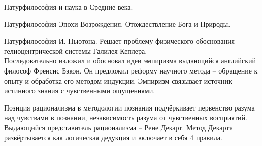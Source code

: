 \documentclass[exam_answers.tex]{subfiles}
\begin{document}
Натурфилософия и наука в Средние века.

Натурфилософия Эпохи Возрождения.
Отождествление Бога и Природы.

Натурфилософия И. Ньютона.
Решает проблему физического обоснования гелиоцентрической системы Галилея-Кеплера.
\\

Последовательно изложил и обосновал идеи эмпиризма выдающийся английский философ Френсис Бэкон.
Он предложил реформу научного метода – обращение к опыту и обработка его методом индукции.
Эмпиризм связывает источник истинного знания с чувственными ощущениями.

Позиция рационализма в методологии познания подчёркивает первенство разума над чувствами в познании, независимость разума от чувственных восприятий.
Выдающийся представитель рационализма – Рене Декарт.
Метод Декарта развёртывается как логическая дедукция и включает в себя 4 правила.
\end{document}
